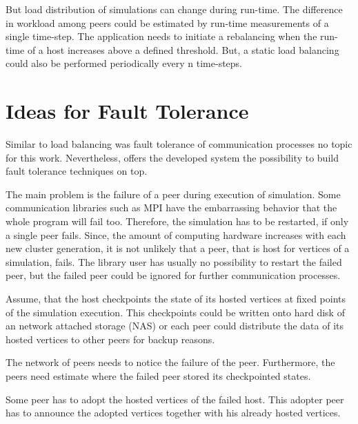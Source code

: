 But load distribution of simulations can change during run-time. The
difference in workload among peers could be estimated by run-time
measurements of a single time-step. The application needs to
initiate a rebalancing when the run-time of a host increases above a
defined threshold.  But, a static load balancing could also be
performed periodically every n time-steps.

\section*{Ideas for Fault Tolerance}

 Similar to load balancing was fault tolerance of communication
  processes no topic for this work. Nevertheless, offers the developed
  system the possibility to build fault tolerance techniques on top.

  The main problem is the failure of a peer during execution of
  simulation.  Some communication libraries such as MPI have the
  embarrassing behavior that the whole program will fail
  too. Therefore, the simulation has to be restarted, if only a single
  peer fails.  Since, the amount of computing hardware increases with
  each new cluster generation, it is not unlikely that a peer, that is
  host for vertices of a simulation, fails. The library user has
  usually no possibility to restart the failed peer, but the failed
  peer could be ignored for further communication processes.

 Assume, that the host checkpoints the state of its hosted
  vertices at fixed points of the simulation execution. This
  checkpoints could be written onto hard disk of an network attached
  storage (NAS) or each peer could distribute the data of its hosted
  vertices to other peers for backup reasons.

 The network of peers needs to notice the failure of the peer.
  Furthermore, the peers need estimate where the failed peer stored its
  checkpointed states.

 Some peer has to adopt the hosted vertices of the failed host.
  This adopter peer has to announce the adopted vertices together
  with his already hosted vertices.

